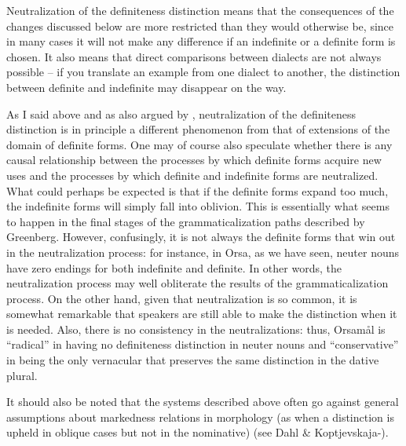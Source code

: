 
Neutralization of the definiteness distinction means that the consequences of the changes discussed below are more restricted than they would otherwise be, since in many cases it will not make any difference if an indefinite or a definite form is chosen. It also means that direct comparisons between dialects are not always possible – if you translate an example from one dialect to another, the distinction between definite and indefinite may disappear on the way. 


As I said above and as also argued by \citet{Hummelstedt1934}, neutralization of the definiteness distinction is in principle a different phenomenon from that of extensions of the domain of definite forms. One may of course also speculate whether there is any causal relationship between the processes by which definite forms acquire new uses and the processes by which definite and indefinite forms are neutralized. What could perhaps be expected is that if the definite forms expand too much, the indefinite forms will simply fall into oblivion. This is essentially what seems to happen in the final stages of the grammaticalization paths described by Greenberg. However, confusingly, it is not always the definite forms that win out in the neutralization process: for instance, in Orsa, as we have seen, neuter nouns have zero endings for both indefinite and definite. In other words, the neutralization process may well obliterate the results of the grammaticalization process. On the other hand, given that neutralization is so common, it is somewhat remarkable that speakers are still able to make the distinction when it is needed. Also, there is no consistency in the neutralizations: thus, Orsamål is “radical” in having no definiteness distinction in neuter nouns and “conservative” in being the only vernacular that preserves the same distinction in the dative plural.


It should also be noted that the systems described above often go against general assumptions about markedness relations in morphology (as when a distinction is upheld in oblique cases but not in the nominative) (see Dahl \& Koptjevskaja-\citet{Tamm2006}).

